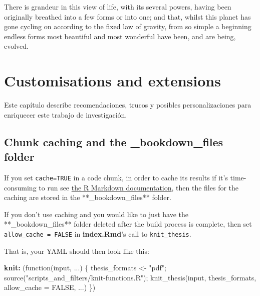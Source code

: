 \documentclass[a4paper, nobind]{templates/ociamthesis}
\newenvironment{Shaded}{\begin{snugshade}}{\end{snugshade}}
\newcommand{\AttributeTok}[1]{\textcolor[rgb]{0.13,0.29,0.53}{#1}}
\newcommand{\FunctionTok}[1]{\textcolor[rgb]{0.13,0.29,0.53}{\textbf{#1}}}
\newcommand{\KeywordTok}[1]{\textcolor[rgb]{0.13,0.29,0.53}{\textbf{#1}}}
\renewenvironment{Shaded}
{
  \vspace{10pt}%
  \begin{snugshade}%
}{%
  \end{snugshade}%
  \vspace{8pt}%
}
\providecommand{\citeproc}[2]{#2}
\begin{document}
\begin{savequote}
There is grandeur in this view of life, with its several powers, having
been originally breathed into a few forms or into one; and that, whilst
this planet has gone cycling on according to the fixed law of gravity,
from so simple a beginning endless forms most beautiful and most
wonderful have been, and are being, evolved.
\qauthor{--- Charles Darwin (\citeproc{ref-Darwin1859}{Darwin, 1859})}\end{savequote}



\chapter{Customisations and extensions}\label{customisations-and-extensions}

\minitoc 

\noindent Este capítulo describe recomendaciones, trucos y posibles personalizaciones para enriquecer este trabajo de investigación.

\section{\texorpdfstring{Chunk caching and the \textbf{\_bookdown\_files} folder}{Chunk caching and the \_bookdown\_files folder}}\label{chunk-caching-and-the-_bookdown_files-folder}

If you set \texttt{cache=TRUE} in a code chunk, in order to cache its results if it's time-consuming to run see \href{https://bookdown.org/yihui/rmarkdown-cookbook/cache.html}{the R Markdown documentation}, then the files for the caching are stored in the **\_bookdown\_files** folder.

If you don't use caching and you would like to just have the **\_bookdown\_files** folder deleted after the build process is complete, then set \texttt{allow\_cache\ =\ FALSE} in \textbf{index.Rmd}'s call to \texttt{knit\_thesis}.

That is, your YAML should then look like this:

\begin{Shaded}
\begin{Highlighting}[]
\FunctionTok{knit}\KeywordTok{:}\AttributeTok{ (function(input, ...) \{}
\AttributeTok{    thesis\_formats \textless{}{-} "pdf";}
\AttributeTok{    }
\AttributeTok{    source("scripts\_and\_filters/knit{-}functions.R");}
\AttributeTok{    knit\_thesis(input, thesis\_formats, allow\_cache = FALSE, ...)}
\AttributeTok{  \})}
\end{Highlighting}
\end{Shaded}
\end{document}
